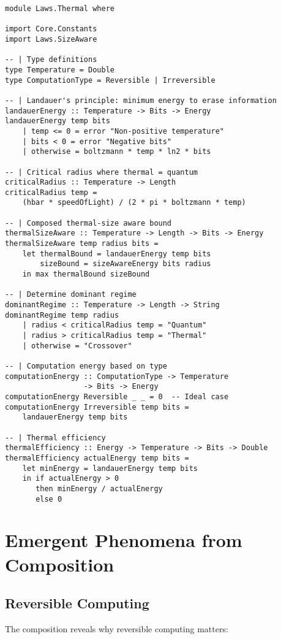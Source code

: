 \documentclass[11pt,a4paper]{article}
\theoremstyle{definition}
\begin{document}
\begin{lstlisting}
module Laws.Thermal where

import Core.Constants
import Laws.SizeAware

-- | Type definitions
type Temperature = Double
type ComputationType = Reversible | Irreversible

-- | Landauer's principle: minimum energy to erase information
landauerEnergy :: Temperature -> Bits -> Energy
landauerEnergy temp bits 
    | temp <= 0 = error "Non-positive temperature"
    | bits < 0 = error "Negative bits"
    | otherwise = boltzmann * temp * ln2 * bits

-- | Critical radius where thermal = quantum
criticalRadius :: Temperature -> Length
criticalRadius temp = 
    (hbar * speedOfLight) / (2 * pi * boltzmann * temp)

-- | Composed thermal-size aware bound
thermalSizeAware :: Temperature -> Length -> Bits -> Energy
thermalSizeAware temp radius bits =
    let thermalBound = landauerEnergy temp bits
        sizeBound = sizeAwareEnergy bits radius
    in max thermalBound sizeBound

-- | Determine dominant regime
dominantRegime :: Temperature -> Length -> String
dominantRegime temp radius
    | radius < criticalRadius temp = "Quantum"
    | radius > criticalRadius temp = "Thermal"  
    | otherwise = "Crossover"

-- | Computation energy based on type
computationEnergy :: ComputationType -> Temperature 
                  -> Bits -> Energy
computationEnergy Reversible _ _ = 0  -- Ideal case
computationEnergy Irreversible temp bits = 
    landauerEnergy temp bits

-- | Thermal efficiency
thermalEfficiency :: Energy -> Temperature -> Bits -> Double
thermalEfficiency actualEnergy temp bits =
    let minEnergy = landauerEnergy temp bits
    in if actualEnergy > 0 
       then minEnergy / actualEnergy
       else 0
\end{lstlisting}

\section{Emergent Phenomena from Composition}

\subsection{Reversible Computing}

The composition reveals why reversible computing matters:
\end{document}
